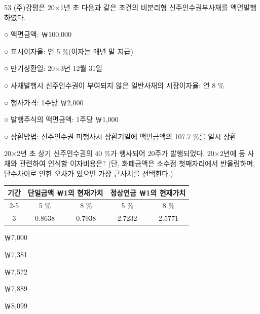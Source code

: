 \begin{question}{53}
(주)감평은 20×1년 초 다음과 같은 조건의 비분리형 신주인수권부사채를 액면발행하였다.
\begin{framedtext}
○ 액면금액: ￦100,000 \par
○ 표시이자율: 연 5 \%(이자는 매년 말 지급) \par
○ 만기상환일: 20×3년 12월 31일 \par
○ 사채발행시 신주인수권이 부여되지 않은 일반사채의 시장이자율: 연 8 \% \par
○ 행사가격: 1주당 ￦2,000 \par
○ 발행주식의 액면금액: 1주당 ￦1,000 \par
○ 상환방법: 신주인수권 미행사시 상환기일에 액면금액의 107.7 \%를 일시 상환 \par
\end{framedtext}
20×2년 초 상기 신주인수권의 40 \%가 행사되어 20주가 발행되었다. 20×2년에 동 사채와 관련하여 인식할 이자비용은? (단, 화폐금액은 소수점 첫째자리에서 반올림하며, 단수차이로 인한 오차가 있으면 가장 근사치를 선택한다.) \par
{\small\centering
\begin{tabular}{|c|c|c|c|c|}\hline
\multirow{2}{*}{기간} & \multicolumn{2}{c|}{단일금액 ￦1의 현재가치} & \multicolumn{2}{c|}{정상연금 ￦1의 현재가치} \\\cline{2-5}
 & 5 \% & 8 \% & 5 \% & 8 \% \\\hline
3 & 0.8638 & 0.7938 & 2.7232 & 2.5771 \\\hline
\end{tabular}\par}
\begin{choices}
  \item ￦7,000
  \item ￦7,381
  \item ￦7,572
  \item ￦7,889
  \item ￦8,099
\end{choices}
\end{question}
